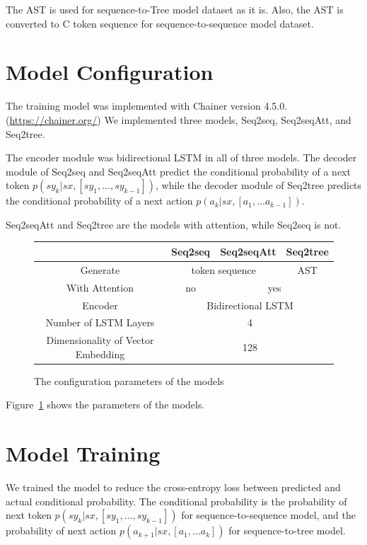 \documentclass[senior,final,11pt]{iscs-thesis}
\begin{document}
The AST is used for sequence-to-Tree model dataset as it is.
Also, the AST is converted to C token sequence for sequence-to-sequence model dataset. 

\section{Model Configuration}
The training model was implemented with Chainer version 4.5.0. (\url{https://chainer.org/})
We implemented three models, Seq2seq, Seq2seqAtt, and Seq2tree.

The encoder module was bidirectional LSTM in all of three models.
The decoder module of Seq2seq and Seq2seqAtt predict the conditional probability of a next token $ p(sy_k|sx,[sy_1,\dots,sy_{k-1}]) $,
while the decoder module of Seq2tree predicts the conditional probability of a next action $ p(a_{k}|sx,[a_1, \dots a_{k-1}]) $.

Seq2seqAtt and Seq2tree are the models with attention, while Seq2seq is not.

\begin{figure}[h]
	\begin{tabular}{|c||c|c|c|}
		\hline
		  & Seq2seq & Seq2seqAtt & Seq2tree \\ \hline \hline
		 Generate & \multicolumn{2}{|c|}{token sequence} & AST \\ \hline
		 With Attention & no & \multicolumn{2}{|c|}{yes} \\ \hline
		 Encoder & \multicolumn{3}{|c|}{Bidirectional LSTM} \\ \hline
		Number of LSTM Layers & \multicolumn{3}{|c|}{4} \\ \hline
		Dimensionality of Vector Embedding & \multicolumn{3}{|c|}{128} \\ \hline
	\end{tabular}
	\caption{The configuration parameters of the models}
	\label{fig:parameterofmodels}
\end{figure}

Figure~\ref{fig:parameterofmodels} shows the parameters of the models. 


\section{Model Training}
We trained the model to reduce the cross-entropy loss between predicted and actual conditional probability.
The conditional probability is the probability of next token $ p(sy_k|sx,[sy_1,\dots,sy_{k-1}]) $ for sequence-to-sequence model, 
and the probability of next action $p(a_{k+1}|sx,[a_1, \dots a_{k}]) $ for sequence-to-tree model.
\end{document}
